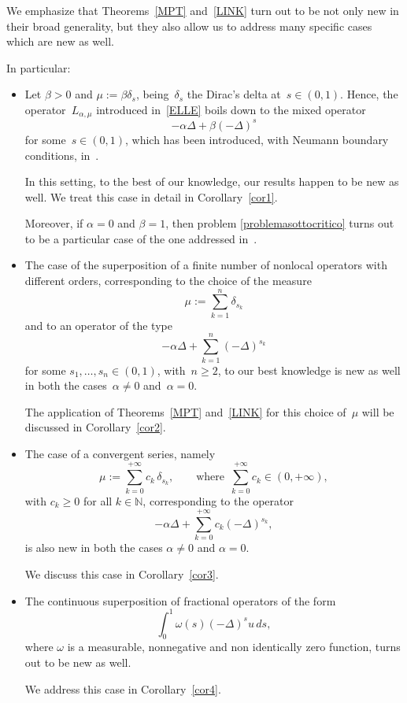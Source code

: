 \documentclass[12pt,a4paper,intlimits,sumlimits]{amsart}
\def \N {\mathbb{N}}
\theoremstyle{definition}
\theoremstyle{plain}
\numberwithin{equation}{section}
\renewcommand{\ge}{\geqslant}
\begin{document}
We emphasize that Theorems~\ref{MPT} and~\ref{LINK} turn out to be not only new in their broad generality, but they also allow us to address many specific cases which are new as well. 

In particular:
\begin{itemize}
\item Let $\beta>0$ and $\mu:=\beta\delta_s$,
being~$\delta_s$ the Dirac's delta at~$s\in(0,1)$. Hence, the operator~$L_{\alpha, \mu}$ introduced in~\eqref{ELLE} boils down to the mixed operator
\[
-\alpha\Delta + \beta(-\Delta)^s
\]
for some~$s\in(0,1)$,  which has been introduced, with Neumann boundary conditions, in~\cite{MR4438596, MR4651677}.

In this setting, to the best of our knowledge, our results happen to be new as well.  We treat this case in detail in Corollary~\ref{cor1}.

Moreover, if $\alpha=0$ and $\beta=1$, then problem 
\eqref{problemasottocritico} turns out to be a particular case
of the one addressed in~\cite[Section~5]{MPPL}.\medskip

\item The case of the superposition of a finite number of nonlocal operators with different orders, corresponding to the choice of the measure
\[
\mu:=\sum_{k=1}^n \delta_{s_k}
\]
and to an operator of the type
\[
-\alpha\Delta+\sum_{k=1}^n (-\Delta)^{s_k}
\]
for some $s_1,\dots, s_n\in(0,1)$, with~$n\ge 2$,
to our best knowledge is new as well in both the cases~$\alpha\neq 0$ and~$\alpha=0$.

The application of Theorems~\ref{MPT} and~\ref{LINK} for this choice of~$\mu$ will be discussed in Corollary~\ref{cor2}.\medskip

\item The case of a convergent series, namely
\[
\mu:= \sum_{k=0}^{+\infty} c_k \,\delta_{s_k}, \qquad{\mbox{where }}\, \sum_{k=0}^{+\infty} c_k\in(0,+\infty),
\]
with $c_k\ge0$ for all $k\in\N$, corresponding to the operator
\[
-\alpha\Delta + \sum_{k=0}^{+\infty} c_k (-\Delta)^{s_k},
\]
is also new in both the cases $\alpha\neq 0$ and $\alpha=0$.

We discuss this case in Corollary~\ref{cor3}.
\medskip

\item The continuous superposition of fractional operators of the form
\[
\int_0^1 \omega(s)(-\Delta)^s u \,ds,
\]
where $\omega$ is a measurable, nonnegative and non identically zero function, turns out to be new as well. 

We address this case in Corollary~\ref{cor4}.
\end{itemize}
\end{document}
